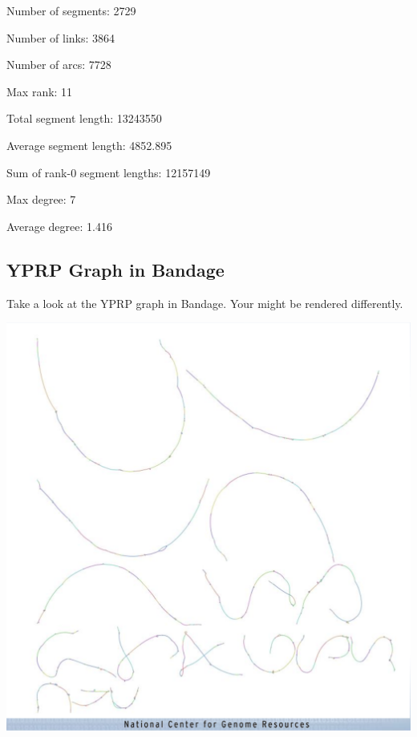 \documentclass[
]{book}
\newenvironment{Shaded}{\begin{snugshade}}{\end{snugshade}}
\newcommand{\BuiltInTok}[1]{#1}
\newcommand{\ExtensionTok}[1]{#1}
\newcommand{\NormalTok}[1]{#1}
\newcommand{\OperatorTok}[1]{\textcolor[rgb]{0.81,0.36,0.00}{\textbf{#1}}}
\newcommand{\VariableTok}[1]{\textcolor[rgb]{0.00,0.00,0.00}{#1}}
\begin{document}
\begin{Shaded}
\end{Shaded}

Number of segments: 2729

Number of links: 3864

Number of arcs: 7728

Max rank: 11

Total segment length: 13243550

Average segment length: 4852.895

Sum of rank-0 segment lengths: 12157149

Max degree: 7

Average degree: 1.416

\hypertarget{yprp-graph-in-bandage}{%
\subsection*{YPRP Graph in Bandage}\label{yprp-graph-in-bandage}}

Take a look at the YPRP graph in Bandage. Your might be rendered differently.

\includegraphics[width=1\textwidth,height=\textheight]{./Figures/YPRPBandage1.png}
\end{document}
